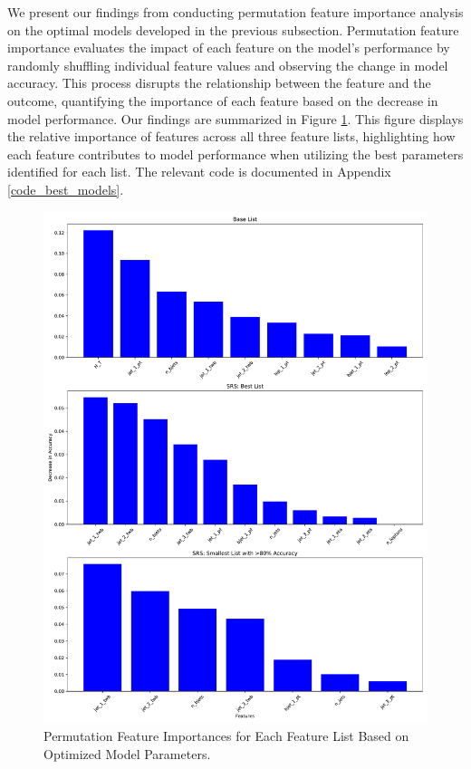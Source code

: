 \documentclass[]{article}
\begin{document}
We present our findings from conducting permutation feature importance analysis on the optimal models developed in the previous subsection. Permutation feature importance evaluates the impact of each feature on the model's performance by randomly shuffling individual feature values and observing the change in model accuracy. This process disrupts the relationship between the feature and the outcome, quantifying the importance of each feature based on the decrease in model performance. Our findings are summarized in Figure \ref{fig:best_models_feature_ranking}. This figure displays the relative importance of features across all three feature lists, highlighting how each feature contributes to model performance when utilizing the best parameters identified for each list.  The relevant code is documented in Appendix \ref{code_best_models}.

\begin{figure}[h!]
	\centering
	\includegraphics[width=\linewidth]{best_model/feature_importances.pdf}
	\caption{Permutation Feature Importances for Each Feature List Based on Optimized Model Parameters. }
	\label{fig:best_models_feature_ranking}
\end{figure}
\end{document}

